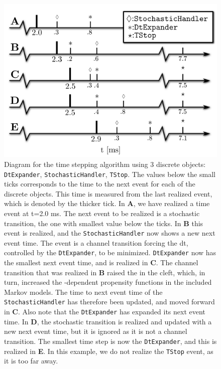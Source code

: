 \begin{figure}
  \label{fig:hake:time-line}
  \centering
  \includegraphics[width=0.6\linewidth]{chapters/hake/pdf/timeline}
  \caption[Time stepping algorithm]{Diagram for the time stepping
    algorithm using 3 discrete objects: \texttt{DtExpander},
    \texttt{StochasticHandler}, \texttt{TStop}. The values below the
    small ticks corresponds to the time to the next event for each of
    the discrete objects. This time is measured from the last realized
    event, which is denoted by the thicker tick. In \textbf{A}, we
    have realized a time event at t=2.0 ms. The next event to be
    realized is a stochastic transition, the one with smallest value
    below the ticks. In \textbf{B} this event is realized, and the
    \texttt{StochasticHandler} now shows a new next event time. The
    event is a channel transition forcing the dt, controlled by the
    \texttt{DtExpander}, to be minimized. \texttt{DtExpander} now has
    the smallest next event time, and is realized in \textbf{C}. The
    channel transition that was realized in \textbf{B} raised the \CaC
    in the cleft, which, in turn, increased the \Ca-dependent
    propensity functions in the included Markov models. The time to
    next event time of the \texttt{StochasticHandler} has therefore
    been updated, and moved forward in \textbf{C}. Also note that the
    \texttt{DtExpander} has expanded its next event time. In
    \textbf{D}, the stochastic transition is realized and updated with
    a new next event time, but it is ignored as it is not a channel
    transition. The smallest time step is now the \texttt{DtExpander},
    and this is realized in \textbf{E}. In this example, we do not
    realize the \texttt{TStop} event, as it is too far away.}
\end{figure}

